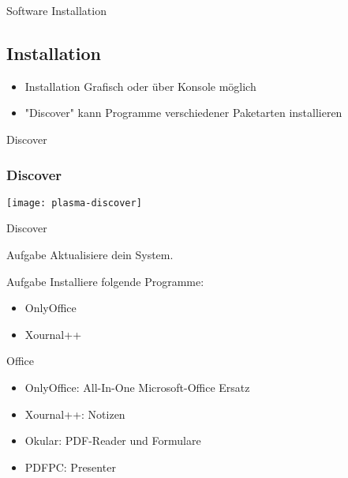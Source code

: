 \begin{frame}{Software Installation}
    \subsection{Installation}\label{subsec:installation}

    \begin{itemize}
        \item Installation Grafisch oder über Konsole möglich
        \item "Discover" kann Programme verschiedener Paketarten installieren
    \end{itemize}

\end{frame}

\begin{frame}{Discover}
    \subsubsection{Discover}\label{subsubsec:discover}

    \texttt{[image: plasma-discover]}
\end{frame}

\begin{frame}{Discover}
    \vspace{0.5cm}
    \begin{alertblock}{Aufgabe}
        Aktualisiere dein System.
    \end{alertblock}

    \vspace{0.5cm}
    \begin{alertblock}{Aufgabe}
        Installiere folgende Programme:
        \begin{itemize}
            \item OnlyOffice
            \item Xournal++
        \end{itemize}
    \end{alertblock}

\end{frame}

\begin{frame}{Office}

    \begin{itemize}
        \item OnlyOffice: All-In-One Microsoft-Office Ersatz
        \item Xournal++: Notizen
        \item Okular: PDF-Reader und Formulare
        \item PDFPC: Presenter
    \end{itemize}

\end{frame}

